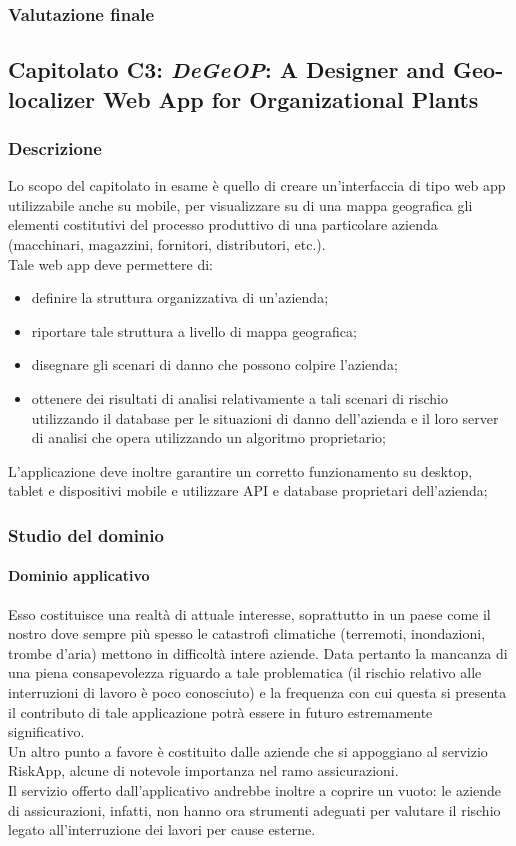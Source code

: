 		\subsubsection{Valutazione finale}
		
	\subsection{Capitolato C3: \emph{DeGeOP}: A Designer and Geo-localizer Web App for Organizational Plants}
		\subsubsection{Descrizione}
		Lo scopo del capitolato in esame è quello di creare un'interfaccia di tipo web app utilizzabile anche su mobile, per visualizzare su di una 
		mappa geografica gli elementi costitutivi del processo produttivo di una particolare azienda (macchinari, magazzini, fornitori, distributori, etc.).
		\\Tale web app deve permettere di:
		\begin{itemize}
			\item definire la struttura organizzativa di un'azienda;
			\item riportare tale struttura a livello di mappa geografica;
			\item disegnare gli scenari di danno che possono colpire l'azienda;
			\item ottenere dei risultati di analisi relativamente a tali scenari di rischio utilizzando il database per le situazioni di danno dell'azienda e il loro server di analisi che opera utilizzando un algoritmo proprietario;
		\end{itemize}
		L'applicazione deve inoltre garantire un corretto funzionamento su desktop, tablet e dispositivi mobile e utilizzare API e database proprietari dell'azienda;
		\subsubsection{Studio del dominio}
			\paragraph{Dominio applicativo}
			Esso costituisce una realtà di attuale interesse, soprattutto in un paese come il nostro dove sempre più spesso le catastrofi climatiche 
			(terremoti, inondazioni, trombe d'aria) mettono in difficoltà intere aziende. Data pertanto la mancanza di una piena consapevolezza 
			riguardo a tale problematica (il rischio relativo alle interruzioni di lavoro è poco conosciuto) e la frequenza con cui questa si presenta 
			il contributo di tale applicazione potrà essere in futuro estremamente significativo.
			\\Un altro punto a favore è costituito dalle aziende che si appoggiano al servizio RiskApp, alcune di notevole importanza nel ramo assicurazioni.
			\\Il servizio offerto dall'applicativo andrebbe inoltre a coprire un vuoto: le aziende di assicurazioni, infatti, non hanno ora strumenti 
			adeguati per valutare il rischio legato all'interruzione dei lavori per cause esterne.
